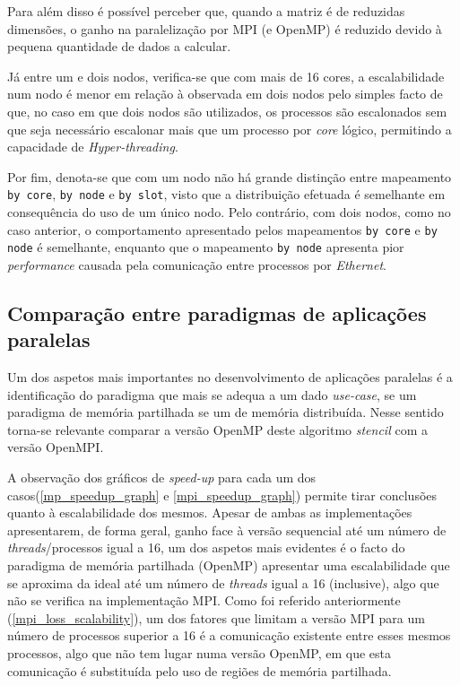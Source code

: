 \documentclass{article}
\begin{document}
Para além disso é possível perceber que, quando a matriz é de reduzidas dimensões, o ganho na paralelização por MPI
(e OpenMP) é reduzido devido à pequena quantidade de dados a calcular.

Já entre um e dois nodos, verifica-se que com mais de 16 cores, a escalabilidade num nodo é menor em relação à observada em dois 
nodos pelo simples facto de que, no caso em que dois nodos são utilizados, os processos são escalonados sem que seja
necessário escalonar mais que um processo por \textit{core} lógico, permitindo a capacidade de \textit{Hyper-threading}.

Por fim, denota-se que com um nodo não há grande distinção entre mapeamento \texttt{by core}, \texttt{by node} e \texttt{by slot}, 
visto que a distribuição efetuada é semelhante em consequência do uso de um único nodo.
Pelo contrário, com dois nodos, como no caso anterior, o comportamento apresentado pelos mapeamentos \texttt{by core} e \texttt{by node} é semelhante, enquanto que o mapeamento \texttt{by node} apresenta pior \textit{performance} causada pela comunicação entre processos por \textit{Ethernet}.


\subsection{Comparação entre paradigmas de aplicações paralelas}
Um dos aspetos mais importantes no desenvolvimento de aplicações paralelas é a identificação do paradigma que mais
se adequa a um dado \textit{use-case}, se um paradigma de memória partilhada se um de memória distribuída.
Nesse sentido torna-se relevante comparar a versão OpenMP deste algoritmo \textit{stencil} com a versão
OpenMPI.

A observação dos gráficos de \textit{speed-up} para cada um dos casos(\ref{mp_speedup_graph} e 
\ref{mpi_speedup_graph}) permite tirar conclusões quanto à escalabilidade dos mesmos. Apesar de ambas as
implementações apresentarem, de forma geral, ganho face à versão sequencial até um número de \textit{threads}/processos 
igual a 16, um dos aspetos mais evidentes é o facto do paradigma de memória partilhada (OpenMP) apresentar uma 
escalabilidade que se aproxima da ideal até um número de \textit{threads} igual a 16 (inclusive), algo que não 
se verifica na implementação MPI. Como foi referido anteriormente (\ref{mpi_loss_scalability}), um dos fatores
que limitam a versão MPI para um número de processos superior a 16 é a comunicação existente entre esses mesmos
processos, algo que não tem lugar numa versão OpenMP, em que esta comunicação é substituída pelo uso de regiões 
de memória partilhada. 
\end{document}
